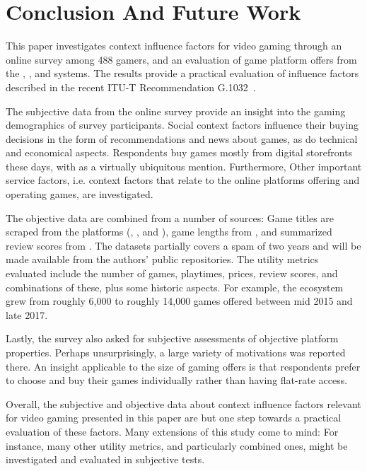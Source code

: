 \section{Conclusion And Future Work}
\label{sec:conclusion}

This paper investigates context influence factors for video gaming
through an online survey among 488 gamers, and an evaluation of
game platform offers from the \steam, \psnow, and \gfnow systems.
The results provide a practical evaluation of influence factors
described in the recent \acrshort{ITU-T} Recommendation
G.1032~\cite{itutg1032}.

The subjective data from the online survey provide an insight into
the gaming demographics of survey participants.
Social context factors influence their buying decisions in the
form of recommendations and news about games, as do technical and
economical aspects.
Respondents buy games mostly from digital storefronts these days,
with \steam as a virtually ubiquitous mention.
Furthermore, Other important service factors, i.e. context factors
that relate to the online platforms offering and operating games,
are investigated.

The objective data are combined from a number of sources:
Game titles are scraped from the platforms (\gfnow, \psnow, and \steam),
game lengths from \hltb, and summarized review scores from
\metacritic.
The datasets partially covers a spam of two years and will
be made available from the authors' public repositories.
The utility metrics evaluated include the number
of games, playtimes, prices, review scores, and combinations of these,
plus some historic aspects.
For example, the \steam ecosystem grew from roughly 6,000 to roughly
14,000 games offered between mid 2015 and late 2017.

Lastly, the survey also asked for subjective assessments of objective
platform properties. Perhaps unsurprisingly, a large variety of
motivations was reported there. An insight applicable to the size
of gaming offers is that respondents prefer to choose and buy their 
games individually rather than having flat-rate access.

Overall, the subjective and objective data about context influence
factors relevant for video gaming presented in this paper are but
one step towards a practical evaluation of these factors.
Many extensions of this study come to mind:
For instance, many other utility metrics, and
particularly combined ones, might be investigated and evaluated
in subjective tests.

